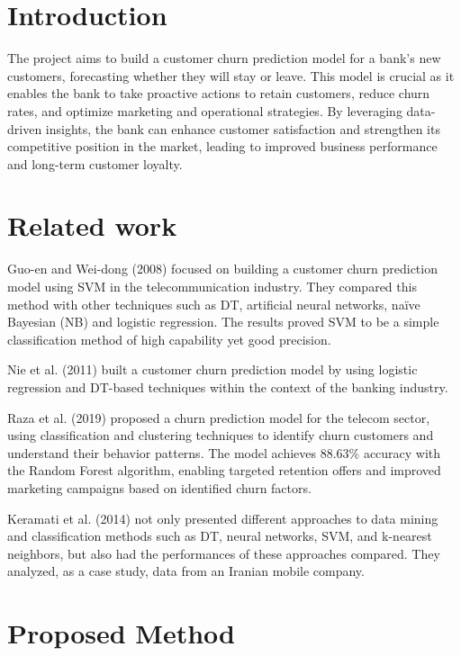 \documentclass{article}
\begin{document}
\begin{multicols}{2}

\section{Introduction}


The project aims to build a customer churn prediction model for a bank's new customers, forecasting whether they will stay or leave. This model is crucial as it enables the bank to take proactive actions to retain customers, reduce churn rates, and optimize marketing and operational strategies. By leveraging data-driven insights, the bank can enhance customer satisfaction and strengthen its competitive position in the market, leading to improved business performance and long-term customer loyalty.

\section{Related work}

Guo-en and Wei-dong (2008) focused on building a customer churn prediction model using SVM in the telecommunication industry. They compared this method with other techniques such as DT, artificial neural networks, naïve Bayesian (NB) and logistic regression. The results proved SVM to be a simple classification method of high capability yet good precision. \cite{article}

Nie et al. (2011) built a customer churn prediction model by using logistic regression and DT-based techniques within the context of the banking industry. \cite{journals/eswa/NieRZTS11}

Raza et al. (2019) proposed a churn prediction model for the telecom sector, using classification and clustering techniques to identify churn customers and understand their behavior patterns. The model achieves 88.63\% accuracy with the Random Forest algorithm, enabling targeted retention offers and improved marketing campaigns based on identified churn factors.\cite{ullah2019churn}

Keramati et al. (2014) not only presented different approaches to data mining and classification methods such as DT, neural networks, SVM, and k-nearest neighbors, but also had the performances of these approaches compared. They analyzed, as a case study, data from an Iranian mobile company. \cite{NIE201115273}

\section{Proposed Method}


\end{multicols}
\end{document}
